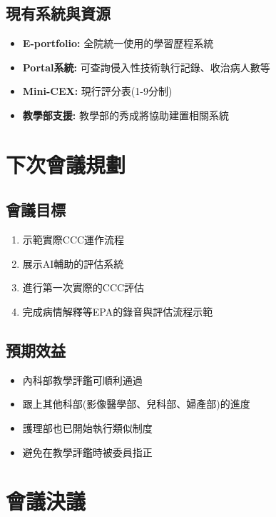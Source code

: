 \documentclass[12pt,a4paper]{article}
\begin{document}
\begin{enumerate}[leftmargin=*]
\subsection{現有系統與資源}

\begin{itemize}[leftmargin=*]
    \item \textbf{E-portfolio:} 全院統一使用的學習歷程系統
    \item \textbf{Portal系統:} 可查詢侵入性技術執行記錄、收治病人數等
    \item \textbf{Mini-CEX:} 現行評分表(1-9分制)
    \item \textbf{教學部支援:} 教學部的秀成將協助建置相關系統
\end{itemize}

\section{下次會議規劃}

\subsection{會議目標}

\begin{enumerate}[leftmargin=*]
    \item 示範實際CCC運作流程
    \item 展示AI輔助的評估系統
    \item 進行第一次實際的CCC評估
    \item 完成病情解釋等EPA的錄音與評估流程示範
\end{enumerate}

\subsection{預期效益}

\begin{itemize}[leftmargin=*]
    \item 內科部教學評鑑可順利通過
    \item 跟上其他科部(影像醫學部、兒科部、婦產部)的進度
    \item 護理部也已開始執行類似制度
    \item 避免在教學評鑑時被委員指正
\end{itemize}

\section{會議決議}


\end{enumerate}
\end{document}
